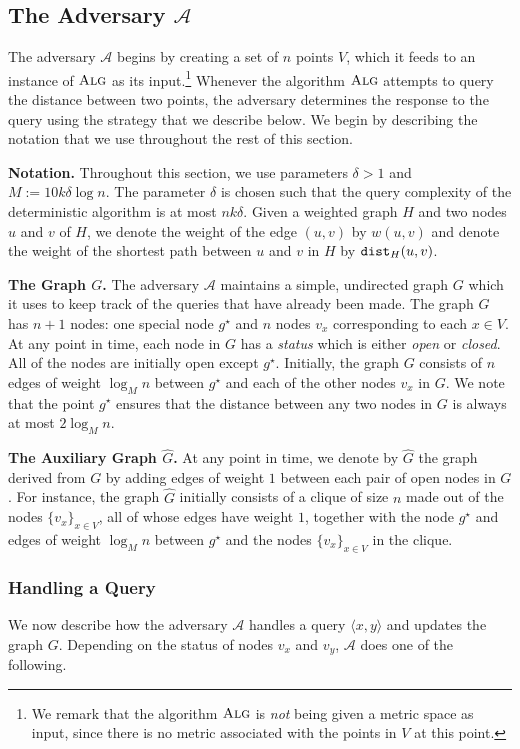 \documentclass[11pt]{article}
\newcommand{\1}{\mathmybb{1}}
\newcommand{\A}{\textsc{Alg}}
\newcommand{\dist}{\textnormal{\texttt{dist}}}
\newcommand{\adv}[0]{\mathcal{A}}
\begin{document}
\subsection{The Adversary $\adv$}

The adversary $\adv$ begins by creating a set of $n$ points $V$, which it feeds to an instance of $\A$ as its input.\footnote{We remark that the algorithm $\A$ is \emph{not} being given a metric space as input, since there is no metric associated with the points in $V$ at this point.} Whenever the algorithm $\A$ attempts to query the distance between two points, the adversary determines the response to the query using the strategy that we describe below.
We begin by describing the notation that we use throughout the rest of this section.

\medskip
\noindent
\textbf{Notation.}
Throughout this section, we use parameters $\delta > 1$ and $M := 10k\delta \log n$.
The parameter $\delta$ is chosen such that the query complexity of the deterministic algorithm is at most $nk\delta$.
Given a weighted graph $H$ and two nodes $u$ and $v$ of $H$, we denote the weight of the edge $(u,v)$ by $w(u,v)$ and denote the weight of the shortest path between $u$ and $v$ in $H$ by $\dist_H(u,v)$.


\medskip
\noindent
\textbf{The Graph $G$.}
The adversary $\adv$ maintains a simple, undirected graph $G$ which it uses to keep track of the queries that have already been made. The graph $G$ has $n + 1$ nodes: one special node $g^\star$ and $n$ nodes $v_x$ corresponding to each $x \in V$.
At any point in time, each node in $G$ has a \emph{status} which is either \textit{open} or \textit{closed}.
All of the nodes are initially open except $g^\star$.
Initially, the graph $G$ consists of $n$ edges of weight $\log_M n$ between $g^\star$ and each of the other nodes $v_x$ in $G$.
We note that the point $g^\star$ ensures that the distance between any two nodes in $G$ is always at most $2\log_M n$.

\medskip
\noindent
\textbf{The Auxiliary Graph $\widehat G$.}
At any point in time, we denote by $\widehat G$ the graph derived from $G$ by adding edges of weight $1$ between each pair of open nodes in $G$.
For instance, the graph $\widehat G$ initially consists of a clique of size $n$ made out of the nodes $\{v_x\}_{x \in V}$, all of whose edges have weight $1$, together with the node $g^\star$ and edges of weight $\log_M n$ between $g^\star$ and the nodes $\{v_x\}_{x \in V}$ in the clique.

\subsubsection*{Handling a Query}
We now describe how the adversary $\adv$ handles a query $\langle x,y \rangle$ and updates the graph $G$.
Depending on the status of nodes $v_x$ and $v_y$, $\adv$ does one of the following.
\end{document}
